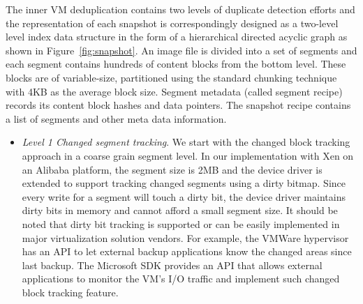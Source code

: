 The inner VM deduplication contains two levels of duplicate detection efforts and the representation of
each snapshot is correspondingly designed as a two-level level index data structure in the form of a hierarchical
directed acyclic graph as shown in Figure~\ref{fig:snapshot}.
An image file is divided into a set of segments and each  segment contains hundreds of content blocks from the bottom level.
These blocks are of variable-size, partitioned using
the standard chunking technique~\cite{similar94} with 4KB as the average block size. 
Segment metadata (called segment recipe) records its  content block hashes and data pointers. 
The snapshot recipe contains a list of segments and other meta data information.
\begin{itemize}
\item {\em Level 1 Changed segment tracking}.
We start with the changed block tracking approach in a coarse grain segment level.
In our implementation with Xen on an Alibaba platform, the segment size is 2MB
and the device driver is extended to support tracking changed segments using a dirty bitmap. 
Since every write for a segment will touch a dirty bit, the device driver maintains dirty bits in memory
and cannot afford a small segment size.
It should be noted that dirty bit tracking is supported or can be easily implemented in 
major virtualization solution vendors. For example,
the VMWare hypervisor has an API to let external backup applications know 
the changed areas since last backup. 
The Microsoft SDK provides an API that allows external applications to monitor 
the VM's I/O traffic and implement such changed block tracking feature.


\end{itemize}
